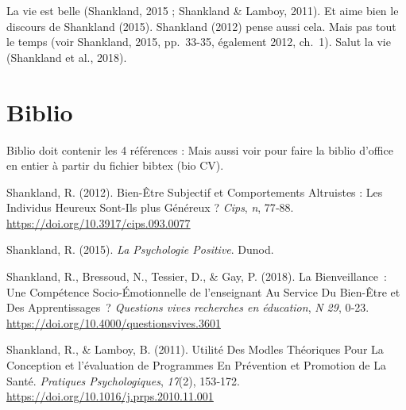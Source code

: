 \documentclass[
  french,
]{article}
\newlength{\cslhangindent}
\newenvironment{cslreferences}%
  {\setlength{\parindent}{0pt}%
  \everypar{\setlength{\hangindent}{\cslhangindent}}\ignorespaces}%
  {\par}
\begin{document}
La vie est belle (Shankland, 2015 ; Shankland \& Lamboy, 2011). Et aime bien le discours de Shankland (2015). Shankland (2012) pense aussi cela. Mais pas tout le temps (voir Shankland, 2015, pp.~33-35, également 2012, ch.~1). Salut la vie (Shankland et al., 2018).

\hypertarget{biblio}{%
\section{Biblio}\label{biblio}}

Biblio doit contenir les 4 références :
Mais aussi voir pour faire la biblio d'office en entier à partir du fichier bibtex (bio CV).

\hypertarget{refs}{}
\begin{cslreferences}
\leavevmode\hypertarget{ref-shankland2012}{}%
Shankland, R. (2012). Bien-Être Subjectif et Comportements Altruistes : Les Individus Heureux Sont-Ils plus Généreux ? \emph{Cips}, \emph{n}, 77‑88. \url{https://doi.org/10.3917/cips.093.0077}

\leavevmode\hypertarget{ref-shankland2015}{}%
Shankland, R. (2015). \emph{La Psychologie Positive}. Dunod.

\leavevmode\hypertarget{ref-shankland2018a}{}%
Shankland, R., Bressoud, N., Tessier, D., \& Gay, P. (2018). La Bienveillance~: Une Compétence Socio-Émotionnelle de l'enseignant Au Service Du Bien-Être et Des Apprentissages~? \emph{Questions vives recherches en éducation}, \emph{N 29}, 0‑23. \url{https://doi.org/10.4000/questionsvives.3601}

\leavevmode\hypertarget{ref-shankland2011}{}%
Shankland, R., \& Lamboy, B. (2011). Utilité Des Modles Théoriques Pour La Conception et l'évaluation de Programmes En Prévention et Promotion de La Santé. \emph{Pratiques Psychologiques}, \emph{17}(2), 153‑172. \url{https://doi.org/10.1016/j.prps.2010.11.001}
\end{cslreferences}
\end{document}
